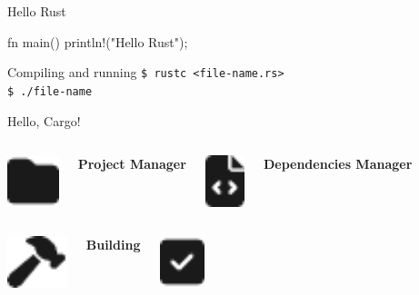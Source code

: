     \begin{frame}[fragile]{Hello Rust}
        \begin{code}
            fn main() {
                println!("Hello Rust");
            }
        \end{code}

        \begin{alertblock}{Compiling and running}
            \tt{\$ rustc <file-name.rs>} \\
            \tt{\$ ./file-name}
        \end{alertblock}
    \end{frame}

    \begin{frame}{Hello, Cargo!}
        \begin{columns}[t, onlytextwidth]
                \centering
                \includegraphics[height=1.5cm, keepaspectratio]{images/folder.pdf}

                \textbf{Project Manager}

                \centering
                \includegraphics[height=1.5cm, keepaspectratio]{images/file-code.pdf}

                \textbf{Dependencies Manager}
        \end{columns}

        \vspace{1cm}

        \begin{columns}[t, onlytextwidth]
                \centering
                \includegraphics[height=1.5cm, keepaspectratio]{images/hammer.pdf}

                \textbf{Building}

                \centering
                \includegraphics[height=1.5cm, keepaspectratio]{images/square-check.pdf}


\end{columns}
\end{frame}

